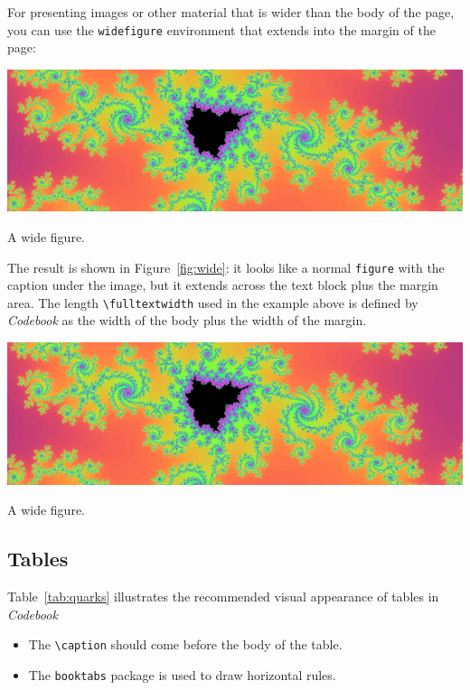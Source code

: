 \documentclass[minted]{codebook}
\begin{document}
For presenting images or other material that is wider than the body of the page, you can use the \texttt{widefigure} environment that extends into the margin of the page:
\begin{texcode}
\begin{widefigure}
  \includegraphics[width=\fulltextwidth]{mandel-wide.png}
  \caption{A wide figure.}
\end{widefigure}
\end{texcode}
The result is shown in Figure~\ref{fig:wide}: it looks like a normal \texttt{figure} with the caption under the image, but it extends across the text block plus the margin area.
The length \verb|\fulltextwidth| used in the example above is defined by \emph{Codebook} as the width of the body plus the width of the margin.

\begin{widefigure}
  \centering
  \includegraphics[width=\fulltextwidth]{mandel-wide.png}
  \caption{A wide figure.}
  \label{fig:wide}
\end{widefigure}


\subsection{Tables}

Table~\ref{tab:quarks} illustrates the recommended visual appearance of tables in \emph{Codebook}


\begin{itemize}
  \item The \verb|\caption| should come before the body of the table.
  \item The \verb|booktabs| package is used to draw horizontal rules.
\end{itemize}
\end{document}
